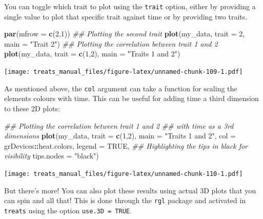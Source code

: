 \documentclass[
]{book}
\newenvironment{Shaded}{\begin{snugshade}}{\end{snugshade}}
\newcommand{\CommentTok}[1]{\textcolor[rgb]{0.56,0.35,0.01}{\textit{#1}}}
\newcommand{\DataTypeTok}[1]{\textcolor[rgb]{0.13,0.29,0.53}{#1}}
\newcommand{\DecValTok}[1]{\textcolor[rgb]{0.00,0.00,0.81}{#1}}
\newcommand{\KeywordTok}[1]{\textcolor[rgb]{0.13,0.29,0.53}{\textbf{#1}}}
\newcommand{\NormalTok}[1]{#1}
\newcommand{\OperatorTok}[1]{\textcolor[rgb]{0.81,0.36,0.00}{\textbf{#1}}}
\newcommand{\OtherTok}[1]{\textcolor[rgb]{0.56,0.35,0.01}{#1}}
\newcommand{\StringTok}[1]{\textcolor[rgb]{0.31,0.60,0.02}{#1}}
\begin{document}
You can toggle which trait to plot using the \texttt{trait} option, either by providing a single value to plot that specific trait against time or by providing two traits.

\begin{Shaded}
\begin{Highlighting}[]
\KeywordTok{par}\NormalTok{(}\DataTypeTok{mfrow =} \KeywordTok{c}\NormalTok{(}\DecValTok{2}\NormalTok{,}\DecValTok{1}\NormalTok{))}
\CommentTok{\#\# Plotting the second trait}
\KeywordTok{plot}\NormalTok{(my\_data, }\DataTypeTok{trait =} \DecValTok{2}\NormalTok{, }\DataTypeTok{main =} \StringTok{"Trait 2"}\NormalTok{)}
\CommentTok{\#\# Plotting the correlation between trait 1 and 2}
\KeywordTok{plot}\NormalTok{(my\_data, }\DataTypeTok{trait =} \KeywordTok{c}\NormalTok{(}\DecValTok{1}\NormalTok{,}\DecValTok{2}\NormalTok{), }\DataTypeTok{main =} \StringTok{"Traits 1 and 2"}\NormalTok{)}
\end{Highlighting}
\end{Shaded}

\texttt{[image: treats\_manual\_files/figure-latex/unnamed-chunk-109-1.pdf]}

As mentioned above, the \texttt{col} argument can take a function for scaling the elements colours with time.
This can be useful for adding time a third dimension to these 2D plots:

\begin{Shaded}
\begin{Highlighting}[]
\CommentTok{\#\# Plotting the correlation between trait 1 and 2}
\CommentTok{\#\# with time as a 3rd dimensions}
\KeywordTok{plot}\NormalTok{(my\_data, }\DataTypeTok{trait =} \KeywordTok{c}\NormalTok{(}\DecValTok{1}\NormalTok{,}\DecValTok{2}\NormalTok{), }\DataTypeTok{main =} \StringTok{"Traits 1 and 2"}\NormalTok{,}
     \DataTypeTok{col =}\NormalTok{ grDevices}\OperatorTok{::}\NormalTok{heat.colors, }\DataTypeTok{legend =} \OtherTok{TRUE}\NormalTok{,}
     \CommentTok{\#\# Highlighting the tips in black for visibility}
     \DataTypeTok{tips.nodes =} \StringTok{"black"}\NormalTok{)}
\end{Highlighting}
\end{Shaded}

\texttt{[image: treats\_manual\_files/figure-latex/unnamed-chunk-110-1.pdf]}

But there's more! You can also plot these results using actual 3D plots that you can spin and all that!
This is done through the \texttt{rgl} package and activated in \texttt{treats} using the option \texttt{use.3D\ =\ TRUE}.
\end{document}

